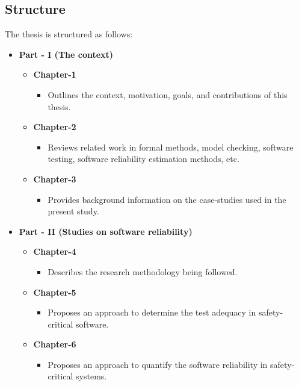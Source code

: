 \subsection{Structure}
The thesis is structured as follows:\vfill
\begin{itemize}
\item {\bf Part - I (The context)}

\begin{itemize}
\item {\bf Chapter-1}

\begin{itemize}
\item Outlines the context, motivation, goals, and contributions of this thesis.
\end{itemize}

\item {\bf Chapter-2} 
\begin{itemize}
\item Reviews related work in formal methods, model checking, software testing, software reliability estimation methods, etc.
\end{itemize}
\item {\bf Chapter-3} 
\begin{itemize}
\item Provides background information on the case-studies used in the present study.
\end{itemize}
\end{itemize}\vfill

\item {\bf Part - II (Studies on software reliability)}
\begin{itemize}
\item {\bf Chapter-4} 

\begin{itemize}
\item Describes the research methodology being followed.
\end{itemize}
\item  {\bf Chapter-5} 

\begin{itemize}
\item Proposes an approach to determine the test adequacy in safety-critical software.
\end{itemize}\clearpage
\item  {\bf Chapter-6} 

\begin{itemize}
\item Proposes an approach to quantify the software reliability in safety-critical systems.
\end{itemize}


\end{itemize}
\end{itemize}
